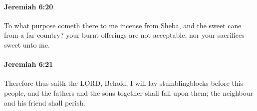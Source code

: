 		\paragraph{Jeremiah 6:20} %
			\label{JEREMIAH-6-20}

			To what purpose cometh there to me incense from Sheba, and the sweet cane from a far country? your burnt offerings are not acceptable, nor your sacrifices sweet unto me.


		\paragraph{Jeremiah 6:21} %
			\label{JEREMIAH-6-21}

			Therefore thus saith the LORD, Behold, I will lay stumblingblocks before this people, and the fathers and the sons together shall fall upon them; the neighbour and his friend shall perish.


